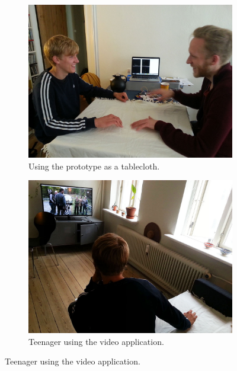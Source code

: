 \begin{figure}[t]
    \centering
    \begin{subfigure}[t]{0.44\textwidth}
        \centering
        \includegraphics[width=\textwidth]{figures/touch/evaluation/sebastian/table}
        \caption{Using the prototype as a tablecloth.}
        \label{fig:textiletouch:eval:sebastian:table}
    \end{subfigure}%
    \hspace{0.02\textwidth}
    \begin{subfigure}[t]{0.44\textwidth}
        \centering
        \includegraphics[width=\textwidth]{figures/touch/evaluation/sebastian/sofa_behind_seb}
        \caption{Teenager using the video application.}
        \label{fig:textiletouch:eval:sebastian:sofa_behind}
    \end{subfigure}


\end{figure}

